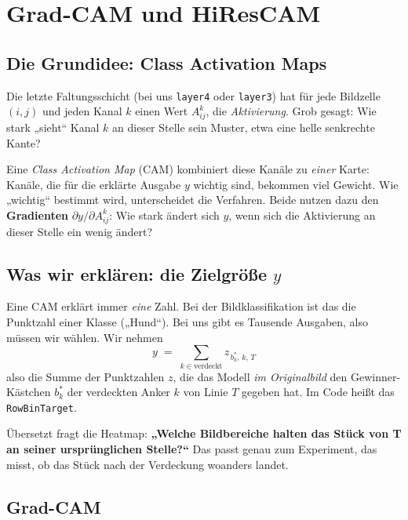 \documentclass[11pt,a4paper]{article}
\newcommand{\code}[1]{\texttt{#1}}
\begin{document}
\section{Grad-CAM und HiResCAM}
\label{sec:cam}

\subsection{Die Grundidee: Class Activation Maps}

Die letzte Faltungsschicht (bei uns \code{layer4} oder \code{layer3}) hat für jede Bildzelle
$(i,j)$ und jeden Kanal $k$ einen Wert $A^k_{ij}$, die \emph{Aktivierung}. Grob gesagt: Wie stark
„sieht“ Kanal $k$ an dieser Stelle sein Muster, etwa eine helle senkrechte Kante?

Eine \emph{Class Activation Map} (CAM) kombiniert diese Kanäle zu \emph{einer} Karte: Kanäle, die
für die erklärte Ausgabe $y$ wichtig sind, bekommen viel Gewicht. Wie „wichtig“ bestimmt wird,
unterscheidet die Verfahren. Beide nutzen dazu den \textbf{Gradienten} $\partial y / \partial
A^k_{ij}$: Wie stark ändert sich $y$, wenn sich die Aktivierung an dieser Stelle ein wenig ändert?

\subsection{Was wir erklären: die Zielgröße $y$}

Eine CAM erklärt immer \emph{eine} Zahl. Bei der Bildklassifikation ist das die Punktzahl einer
Klasse („Hund“). Bei uns gibt es Tausende Ausgaben, also müssen wir wählen. Wir nehmen
\begin{equation*}
  y \;=\; \sum_{k \in \text{verdeckt}} z_{\,b^\ast_k,\,k,\,T}
\end{equation*}
also die Summe der Punktzahlen $z$, die das Modell \emph{im Originalbild} den Gewinner-Kästchen
$b^\ast_k$ der verdeckten Anker $k$ von Linie $T$ gegeben hat. Im Code heißt das
\code{RowBinTarget}.

Übersetzt fragt die Heatmap: \textbf{„Welche Bildbereiche halten das Stück von T an seiner
ursprünglichen Stelle?“} Das passt genau zum Experiment, das misst, ob das Stück nach der
Verdeckung woanders landet.

\subsection{Grad-CAM}
\end{document}
